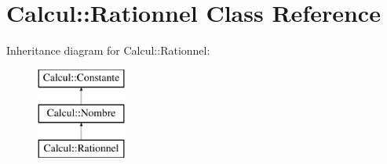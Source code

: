 \hypertarget{class_calcul_1_1_rationnel}{\section{Calcul\-:\-:Rationnel Class Reference}
\label{class_calcul_1_1_rationnel}
}
Inheritance diagram for Calcul\-:\-:Rationnel\-:\begin{figure}[H]
\begin{center}
\leavevmode
\includegraphics[height=3.000000cm]{class_calcul_1_1_rationnel}
\end{center}
\end{figure}

